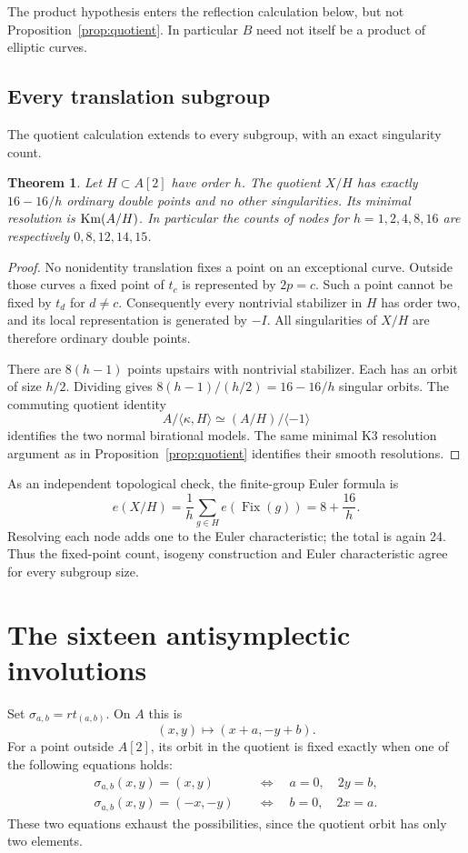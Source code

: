 \documentclass[11pt]{amsart}
\newtheorem{theorem}{Theorem}[section]
\theoremstyle{definition}
\newcommand{\Fix}{\operatorname{Fix}}\newcommand{\NS}{\operatorname{NS}}
\begin{document}
The product hypothesis enters the reflection calculation below, but not
Proposition~\ref{prop:quotient}. In particular $B$ need not itself be a
product of elliptic curves.

\subsection{Every translation subgroup}
The quotient calculation extends to every subgroup, with an exact
singularity count.
\begin{theorem}\label{thm:subgroup}
Let $H\subset A[2]$ have order $h$. The quotient $X/H$ has exactly
$16-16/h$ ordinary double points and no other singularities. Its
minimal resolution is $\operatorname{Km}(A/H)$. In particular the counts of nodes
for $h=1,2,4,8,16$ are respectively $0,8,12,14,15$.
\end{theorem}
\begin{proof}
No nonidentity translation fixes a point on an exceptional curve.
Outside those curves a fixed point of $t_c$ is represented by
$2p=c$. Such a point cannot be fixed by $t_d$ for $d\ne c$.
Consequently every nontrivial stabilizer in $H$ has order two,
and its local representation is generated by $-I$.
All singularities of $X/H$ are therefore ordinary double points.

There are $8(h-1)$ points upstairs with nontrivial stabilizer.
Each has an orbit of size $h/2$. Dividing gives
$8(h-1)/(h/2)=16-16/h$ singular orbits. The commuting quotient
identity
\[
 A/\langle\kappa,H\rangle\simeq(A/H)/\langle-1\rangle
\]
identifies the two normal birational models. The same minimal K3
resolution argument as in Proposition~\ref{prop:quotient} identifies
their smooth resolutions.
\end{proof}

As an independent topological check, the finite-group Euler formula is
\[
 e(X/H)=\frac1h\sum_{g\in H}e(\Fix(g))=8+\frac{16}h.
\]
Resolving each node adds one to the Euler characteristic; the total
is again 24. Thus the fixed-point count, isogeny construction and
Euler characteristic agree for every subgroup size.

\section{The sixteen antisymplectic involutions}
Set $\sigma_{a,b}=rt_{(a,b)}$. On $A$ this is
\[
 (x,y)\longmapsto(x+a,-y+b).
\]
For a point outside $A[2]$, its orbit in the quotient is fixed exactly
when one of the following equations holds:
\begin{align}
 \sigma_{a,b}(x,y)=(x,y)
   &\quad\Longleftrightarrow\quad a=0,\quad 2y=b,\label{eq:plus}\\
 \sigma_{a,b}(x,y)=(-x,-y)
   &\quad\Longleftrightarrow\quad b=0,\quad 2x=a.\label{eq:minus}
\end{align}
These two equations exhaust the possibilities, since the quotient orbit
has only two elements.
\end{document}
